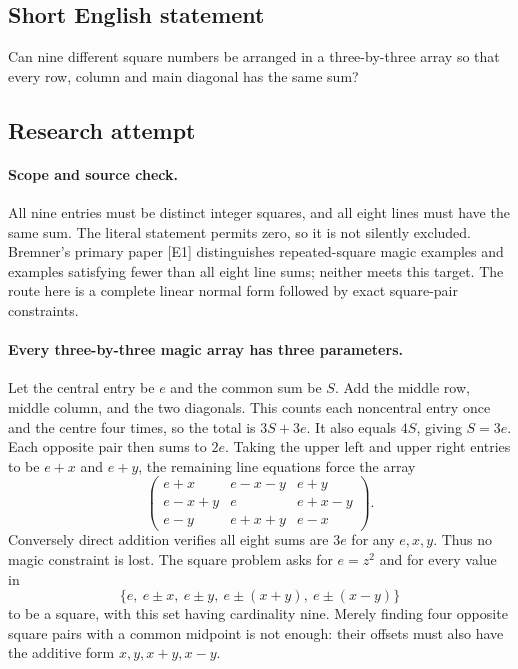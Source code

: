 \documentclass[11pt,a4paper]{article}
\begin{document}
\subsection{Short English statement}

Can nine different square numbers be arranged in a three-by-three array so that every row, column and main diagonal has the same sum?

\subsection{Research attempt}

\paragraph{Scope and source check.}
All nine entries must be distinct integer squares, and all eight lines
must have the same sum. The literal statement permits zero, so it is
not silently excluded. Bremner's primary paper [E1] distinguishes
repeated-square magic examples and examples satisfying fewer than all
eight line sums; neither meets this target. The route here is a complete
linear normal form followed by exact square-pair constraints.

\paragraph{Every three-by-three magic array has three parameters.}
Let the central entry be $e$ and the common sum be $S$. Add the middle
row, middle column, and the two diagonals. This counts each noncentral
entry once and the centre four times, so the total is $3S+3e$.
It also equals $4S$, giving $S=3e$. Each opposite pair then sums to
$2e$. Taking the upper left and upper right entries to be $e+x$ and
$e+y$, the remaining line equations force the array
\[
 \begin{pmatrix}
 e+x&e-x-y&e+y\\
 e-x+y&e&e+x-y\\
 e-y&e+x+y&e-x
 \end{pmatrix}.
\]
Conversely direct addition verifies all eight sums are $3e$ for any
$e,x,y$. Thus no magic constraint is lost. The square problem asks for
$e=z^2$ and for every value in
\[
 \{e,\ e\pm x,\ e\pm y,\ e\pm(x+y),\ e\pm(x-y)\}
\]
to be a square, with this set having cardinality nine. Merely finding
four opposite square pairs with a common midpoint is not enough: their
offsets must also have the additive form $x,y,x+y,x-y$.
\end{document}
